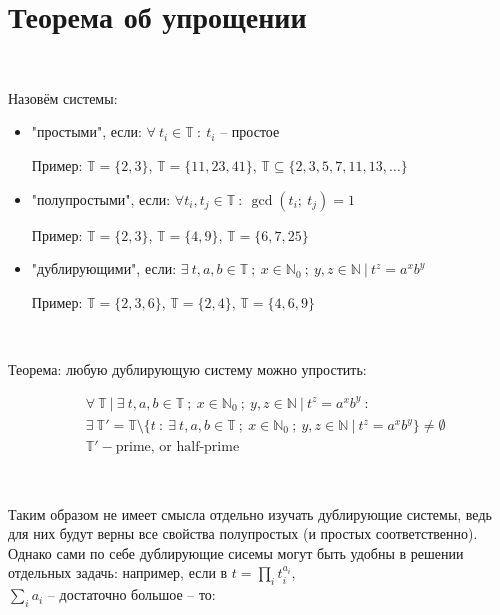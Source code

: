 \vspace{0.5in}

\section{Теорема об упрощении}

\

\noindent Назовём системы:

\begin{itemize}
	\item "простыми", если: $\forall \ t_i \in \mathbb{T} \ : \ t_i$ -- простое
		
		Пример: $\mathbb{T} = \{2, 3\}$, $\mathbb{T} = \{11, 23, 41\}$, $\mathbb{T} \subseteq \{2, 3, 5, 7, 11, 13, \ldots\}$
	
	\item "полупростыми", если: $\forall t_i, t_j \in \mathbb{T} \ : \ \gcd(t_i; \ t_j) = 1$
	
		Пример: $\mathbb{T} = \{2, 3\}$, $\mathbb{T} = \{4, 9\}$, $\mathbb{T} = \{6, 7, 25\}$
	
	\item "дублирующими", если: $\exists \ t, a, b \in \mathbb{T} \ ; \ x \in \mathbb{N}_0 \ ; \ y, z \in \mathbb{N} \ | \ t^z = a^x b^y$
	
		Пример: $\mathbb{T} = \{2, 3, 6\}$, $\mathbb{T} = \{2, 4\}$, $\mathbb{T} = \{4, 6, 9\}$
\end{itemize}

\

Теорема: любую дублирующую систему можно упростить:

\begin{align*}
	&\forall \ \mathbb{T} \ | \ \exists \ t, a, b \in \mathbb{T} \ ; \ x \in \mathbb{N}_0 \ ; \ y, z \in \mathbb{N} \ | \ t^z = a^x b^y \ : \\
	&\exists \ \mathbb{T}' = \mathbb{T} \setminus \{t \ : \ \exists \ t, a, b \in \mathbb{T} \ ; \ x \in \mathbb{N}_0 \ ; \ y, z \in \mathbb{N} \ | \ t^z = a^x b^y \} \ne \emptyset \\
	&\mathbb{T}' - \text{prime, or half-prime}
\end{align*}

\

Таким образом не имеет смысла отдельно изучать дублирующие системы, ведь для них будут верны все свойства полупростых (и простых соответственно). Однако сами по себе дублирующие сисемы могут быть удобны в решении отдельных задачь: например, если в $t = \prod_i t_i^{a_i}$, \\ $\sum_i a_i$ -- достаточно большое -- то:

